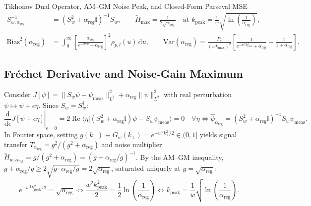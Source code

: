 \documentclass[10pt,letterpaper]{article}
\newcommand{\braket}[2]{\langle #1 | #2 \rangle}
\newcommand{\norm}[1]{\lVert #1 \rVert}
\newcommand{\dd}{\mathrm{d}}
\numberwithin{equation}{section}
\begin{document}
\begin{targeteq}{Tikhonov Dual Operator, AM--GM Noise Peak, and Closed-Form Parseval MSE}
\begin{align*}
  S_{w,\alpha_{\mathrm{reg}}}^{-1} &= (S_w^2 + \alpha_{\mathrm{reg}}\mathbb{I})^{-1}S_w, \qquad \widetilde{H}_{\max} = \frac{1}{2\sqrt{\alpha_{\mathrm{reg}}}} \quad\text{at }k_{\mathrm{peak}} = \frac{1}{w}\sqrt{\ln\!\left(\frac{1}{\alpha_{\mathrm{reg}}}\right)}, \\
  \mathrm{Bias}^2(\alpha_{\mathrm{reg}}) &= \int_0^\infty \left[\frac{\alpha_{\mathrm{reg}}}{e^{-2au}+\alpha_{\mathrm{reg}}}\right]^2 \rho_{p,l}(u)\,\dd u, \qquad \mathrm{Var}(\alpha_{\mathrm{reg}}) = \frac{P_\varepsilon}{(wk_{\max})^2}\left[\frac{1}{e^{-w^2 k_{\max}^2}+\alpha_{\mathrm{reg}}} - \frac{1}{1+\alpha_{\mathrm{reg}}}\right].
\end{align*}
\end{targeteq}

\subsection{Fr\'echet Derivative and Noise-Gain Maximum}
Consider $J[\psi] = \norm{S_w\psi - \psi_{\mathrm{meas}}}_{L^2}^2 + \alpha_{\mathrm{reg}}\norm{\psi}_{L^2}^2$ with real perturbation $\psi \mapsto \psi + \epsilon\eta$. Since $S_w = S_w^\dagger$:
\begin{equation}
  \left.\frac{\dd}{\dd\epsilon}J[\psi + \epsilon\eta]\right|_{\epsilon=0} = 2\operatorname{Re}\braket{\eta}{(S_w^2 + \alpha_{\mathrm{reg}}\mathbb{I})\psi - S_w\psi_{\mathrm{meas}}} = 0 \quad\forall\eta \iff \hat{\psi}_{\alpha_{\mathrm{reg}}} = (S_w^2 + \alpha_{\mathrm{reg}}\mathbb{I})^{-1}S_w\psi_{\mathrm{meas}}.
\end{equation}
In Fourier space, setting $g(k_\perp) \equiv \widetilde{G}_w(k_\perp) = e^{-w^2 k_\perp^2/2} \in (0,1]$ yields signal transfer $T_{\alpha_{\mathrm{reg}}} = g^2/(g^2+\alpha_{\mathrm{reg}})$ and noise multiplier $\widetilde{H}_{w,\alpha_{\mathrm{reg}}} = g/(g^2+\alpha_{\mathrm{reg}}) = (g + \alpha_{\mathrm{reg}}/g)^{-1}$. By the AM--GM inequality, $g + \alpha_{\mathrm{reg}}/g \ge 2\sqrt{g \cdot \alpha_{\mathrm{reg}}/g} = 2\sqrt{\alpha_{\mathrm{reg}}}$, saturated uniquely at $g = \sqrt{\alpha_{\mathrm{reg}}}$:
\begin{equation}
  e^{-w^2 k_{\mathrm{peak}}^2/2} = \sqrt{\alpha_{\mathrm{reg}}} \iff \frac{w^2 k_{\mathrm{peak}}^2}{2} = \frac{1}{2}\ln\!\left(\frac{1}{\alpha_{\mathrm{reg}}}\right) \iff k_{\mathrm{peak}} = \frac{1}{w}\sqrt{\ln\!\left(\frac{1}{\alpha_{\mathrm{reg}}}\right)}.
\end{equation}
\end{document}
